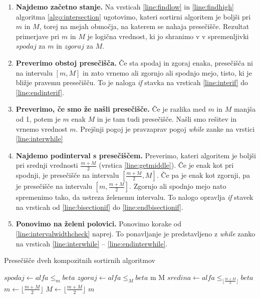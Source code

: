 \documentclass[a4paper,oneside,12pt]{article}
\def\False{\texttt{false}}
\def\True{\texttt{true}}
\begin{document}
\begin{enumerate}
  \item \textbf{Najdemo začetno stanje.} Na vrsticah \ref{line:findlow} in \ref{line:findhigh} algoritma
    \ref{algo:intersection} ugotovimo, kateri sortirni
    algoritem je boljši pri $m$ in $M$, torej na mejah območja, na katerem se nahaja
    presečišče. Rezultat primerjave pri $m$ in $M$ je logična vrednost, ki jo shranimo v
    v spremenljivki $spodaj$ za $m$ in $zgoraj$ za $M$.
  \item \textbf{Preverimo obstoj presečišča.} Če sta spodaj in zgoraj enaka, presečišča ni na intervalu $[m, M]$ in zato
    vrnemo ali zgornjo ali spodnjo mejo, tisto, ki je bližje pravemu presečišču. To je
    naloga \emph{if} stavka na vrsticah \ref{line:interif} do \ref{line:endinterif}.
  \item \textbf{Preverimo, če smo že našli presečišče.} \label{line:intervalwidthcheck}Če je razlika med $m$ in $M$ manjša od 1, potem je $m$ enak $M$ in je tam tudi
    presečišče. Našli smo rešitev in vrnemo vrednost $m$. Prejšnji pogoj je pravzaprav
    pogoj \emph{while} zanke na vrstici \ref{line:interwhile}
  \item \textbf{Najdemo podinterval s presečiščem.} Preverimo, kateri algoritem je boljši pri srednji vrednosti $\frac{m+M}{2}$
    (vrstica \ref{line:getmiddle}).
    Če je enak kot pri spodnji, je presečišče na intervalu $\left[\frac{m+M}{2}, M\right]$. Če pa je
    enak kot zgornji, pa je presečišče na intervalu $\left[m, \frac{m+M}{2}\right]$.
    Zgornjo ali spodnjo mejo nato spremenimo tako, da ustreza želenemu intervalu. To
    nalogo opravlja \emph{if} stavek na vrsticah od \ref{line:bisectionif} do
    \ref{line:endbisectionif}.
  \item \textbf{Ponovimo na želeni polovici.} Ponovimo korake od \ref{line:intervalwidthcheck} naprej. To ponavljanje je
    predstavljeno z \emph{while} zanko na vrsticah \ref{line:interwhile} --
    \ref{line:endinterwhile}.
\end{enumerate}

\begin{algorithm}
  \caption{Presečišče dveh kompozitnih sortirnih algoritmov}\label{algo:intersection}
  \begin{algorithmic}[1]
      \State $spodaj \gets alfa \leq_m beta$ \label{line:findlow} 
      \State $zgoraj \gets alfa \leq_M beta$ \label{line:findhigh}
      \If{$spodaj = zgoraj = \False$} \label{line:interif}
        \Return m 
      \ElsIf{$spodaj = zgoraj = \True$}
        \Return M 
      \EndIf \label{line:endinterif}
       \label{line:interwhile}
        \State $sredina \gets alfa \leq_{\lfloor\frac{m+M}{2}\rfloor} beta$
        \label{line:getmiddle}
         \label{line:bisectionif}
          \State $m \gets \lfloor\frac{m+M}{2}\rfloor$
        \Else
          \State $M \gets \lfloor\frac{m+M}{2}\rfloor$
          \EndIf \label{line:endbisectionif}
        \EndWhile \label{line:endinterwhile}
      \State \Return $m$
    \EndFunction
  \end{algorithmic}
\end{algorithm}
\end{document}
